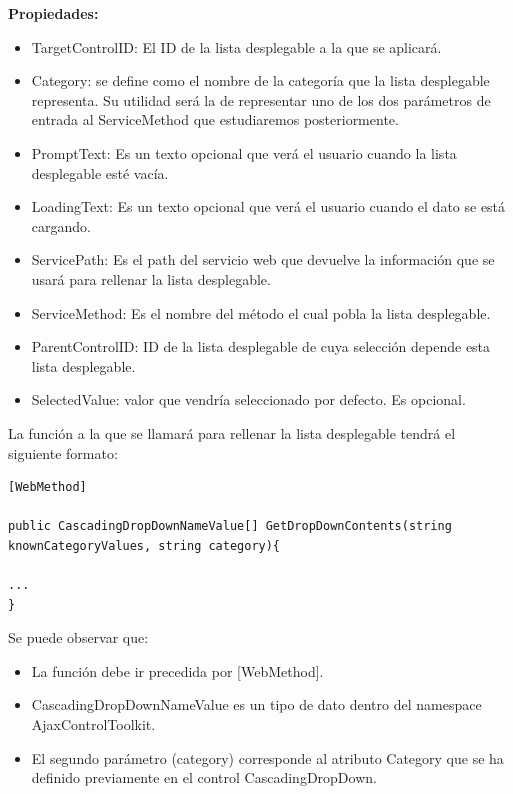 \textbf{Propiedades:}
\begin{itemize}


	\item TargetControlID: El ID de la lista desplegable a la que se aplicará.
	
	\item  Category: se define como el nombre de la categoría que la lista desplegable representa. Su utilidad será la de representar uno de los dos parámetros de entrada al ServiceMethod que estudiaremos posteriormente.
	
	\item  PromptText: Es un texto opcional que verá el usuario cuando la lista desplegable esté vacía.
	
	\item  LoadingText: Es un texto opcional que verá el usuario cuando el dato se está cargando.
	
	\item  ServicePath: Es el path del servicio web que devuelve la información que se usará para rellenar la lista desplegable.
	
	\item  ServiceMethod: Es el nombre del método el cual pobla la lista desplegable.
	
	\item  ParentControlID: ID de la lista desplegable de cuya selección depende esta lista desplegable.
	
	\item  SelectedValue: valor que vendría seleccionado por defecto. Es opcional. 
\end{itemize}



La función a la que se llamará  para rellenar la lista desplegable tendrá el siguiente formato:

 \lstset{language=C, breaklines=true, basicstyle=\footnotesize}
 \begin{lstlisting}[frame=single]
[WebMethod]

public CascadingDropDownNameValue[] GetDropDownContents(string knownCategoryValues, string category){

...
} 
 \end{lstlisting}
 
 Se puede observar que:
 \begin{itemize}
 	\item La función debe ir precedida por [WebMethod].
 	\item CascadingDropDownNameValue es un tipo de dato dentro del namespace AjaxControlToolkit.
 	\item El segundo parámetro (category)  corresponde al atributo Category que  se ha definido previamente en el control CascadingDropDown. 
 \end{itemize}
 
